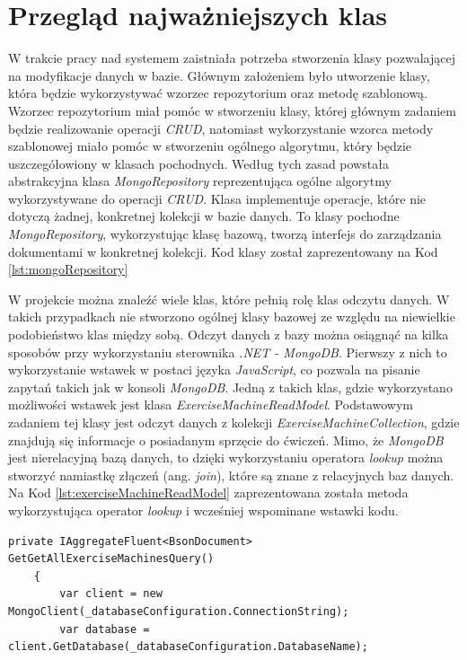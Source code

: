 \documentclass[a4paper,twoside,12pt]{book}
\newcommand{\obcy}[1]{\emph{#1}}
\newcommand{\ang}[1]{{\selectlanguage{british}\obcy{#1}}}
\begin{document}
{\section{Przegląd najważniejszych klas}
W trakcie pracy nad systemem zaistniała potrzeba stworzenia klasy pozwalającej na modyfikacje danych w bazie. Głównym założeniem było utworzenie klasy, która będzie wykorzystywać wzorzec repozytorium oraz metodę szablonową. Wzorzec repozytorium miał pomóc w stworzeniu klasy, której głównym zadaniem będzie realizowanie operacji \textit{CRUD}, natomiast wykorzystanie wzorca metody szablonowej miało pomóc w stworzeniu ogólnego algorytmu, który będzie uszczegółowiony w klasach pochodnych. Według tych zasad powstała abstrakcyjna klasa \textit{MongoRepository} reprezentująca ogólne algorytmy wykorzystywane do operacji \textit{CRUD}. Klasa implementuje operacje, które nie dotyczą żadnej, konkretnej kolekcji w bazie danych. To klasy pochodne \textit{MongoRepository}, wykorzystując klasę bazową, tworzą interfejs do zarządzania dokumentami w konkretnej kolekcji. Kod klasy został zaprezentowany na Kod \ref{lst:mongoRepository}

W projekcie można znaleźć wiele klas, które pełnią rolę klas odczytu danych. W takich przypadkach nie stworzono ogólnej klasy bazowej ze względu na niewielkie podobieństwo klas między sobą. Odczyt danych z bazy można osiągnąć na kilka sposobów przy wykorzystaniu sterownika \textit{.NET - MongoDB}. Pierwszy z nich to wykorzystanie wstawek w postaci języka \textit{JavaScript}, co pozwala na pisanie zapytań takich jak w konsoli \textit{MongoDB}. Jedną z takich klas, gdzie wykorzystano możliwości wstawek jest klasa \textit{ExerciseMachineReadModel}. Podstawowym zadaniem tej klasy jest odczyt danych z kolekcji \textit{ExerciseMachineCollection}, gdzie znajdują się informacje o posiadanym sprzęcie do ćwiczeń. Mimo, że \textit{MongoDB} jest nierelacyjną bazą danych, to dzięki wykorzystaniu operatora \textit{lookup} można stworzyć namiastkę złączeń (ang. \ang{join}), które są znane z relacyjnych baz danych. Na Kod \ref{lst:exerciseMachineReadModel} zaprezentowana została metoda wykorzystująca operator \textit{lookup} i wcześniej wspominane wstawki kodu.
\begin{lstlisting}[caption={Metoda odczytu danych z kolekcji \textit{ExerciseMachineCollection} przy wykorzystaniu wstawek \textit{JavaScript}}, label={lst:exerciseMachineReadModel}]
	private IAggregateFluent<BsonDocument> GetGetAllExerciseMachinesQuery()
	{
		var client = new MongoClient(_databaseConfiguration.ConnectionString);
		var database = client.GetDatabase(_databaseConfiguration.DatabaseName);
		

\end{lstlisting}}
\end{document}
